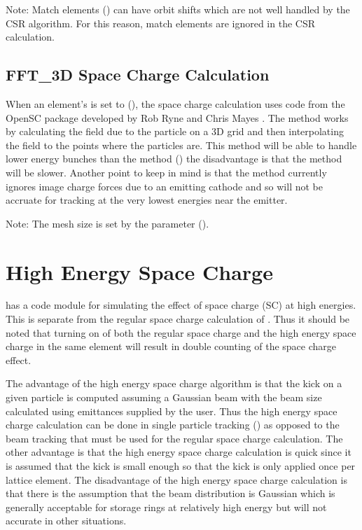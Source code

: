 Note: Match elements () can have orbit shifts which are not well handled by the CSR
algorithm. For this reason, match elements are ignored in the CSR calculation.

\subsection{FFT_3D Space Charge Calculation}
\label{s:sc.fft}

When an element's  is set to  (), the space
charge calculation uses code from the OpenSC package developed by Rob Ryne and Chris Mayes
\cite{b:opensc}. The method works by calculating the field due to the particle on a 3D grid and then
interpolating the field to the points where the particles are. This method will be able to handle
lower energy bunches than the  method () the disadvantage is that the
 method will be slower. Another point to keep in mind is that the  method
currently ignores image charge forces due to an emitting cathode and so will not be accruate for
tracking at the very lowest energies near the emitter.

Note: The mesh size is set by the  parameter 
().

\section{High Energy Space Charge}
\label{s:he.space.charge}

\bmad has a code module for simulating the effect of space charge (SC) at high energies. This is
separate from the regular space charge calculation of . Thus it should be noted that
turning on of both the regular space charge and the high energy space charge in the same element
will result in double counting of the space charge effect.

The advantage of the high energy space charge algorithm is that the kick on a given particle is
computed assuming a Gaussian beam with the beam size calculated using emittances supplied by the
user. Thus the high energy space charge calculation can be done in single particle tracking
() as opposed to the beam tracking that must be used for the regular space charge
calculation. The other advantage is that the high energy space charge calculation is quick since it
is assumed that the kick is small enough so that the kick is only applied once per lattice
element. The disadvantage of the high energy space charge calculation is that there is the
assumption that the beam distribution is Gaussian which is generally acceptable for storage rings at
relatively high energy but will not accurate in other situations.

